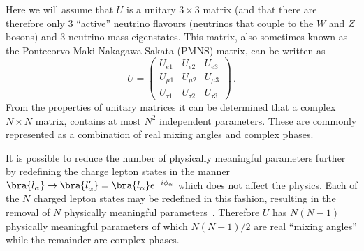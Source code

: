 Here we will assume that $U$ is a unitary $3 \times 3$ matrix (and that there are therefore only 3 ``active'' neutrino flavours (neutrinos that couple to the $W$ and $Z$ bosons) and 3 neutrino mass eigenstates.
This matrix, also sometimes known as the Pontecorvo-Maki-Nakagawa-Sakata (PMNS) matrix, can be written as
\begin{equation}
  U =
  \begin{pmatrix}
    U_{e1}     & U_{e2}     & U_{e3} \\
    U_{\mu 1}  & U_{\mu 2}  & U_{\mu 3} \\
    U_{\tau 1} & U_{\tau 2} & U_{\tau 3}
  \end{pmatrix} \, .
\end{equation}
From the properties of unitary matrices it can be determined that a complex $N \times N$ matrix, contains at most $N^{2}$ independent parameters.
These are commonly represented as a combination of real mixing angles and complex phases.

It is possible to reduce the number of physically meaningful parameters further by redefining the charge lepton states in the manner $\bra{l_{\alpha}} \rightarrow \bra{l_{\alpha}'} = \bra{l_{\alpha}} e^{-i\phi_{\alpha}}$ which does not affect the physics.
Each of the $N$ charged lepton states may be redefined in this fashion, resulting in the removal of $N$ physically meaningful parameters~\cite{kayser2008neutrino}.
Therefore $U$ has $N(N-1)$ physically meaningful parameters of which $N(N-1)/2$ are real ``mixing angles'' while the remainder are complex phases.

